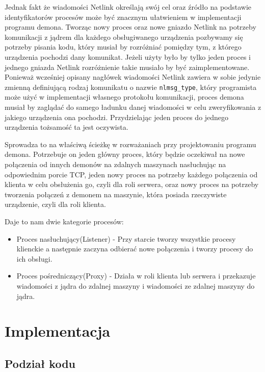 \documentclass[10pt]{scrartcl}
\begin{document}
Jednak fakt że wiadomości Netlink określają swój cel oraz źródło na podstawie identyfikatorów procesów może być znacznym ułatwieniem w implementacji programu demona. Tworząc nowy proces oraz nowe gniazdo Netlink na potrzeby komunikacji z jądrem dla każdego obsługiwanego urządzenia pozbywamy się potrzeby pisania kodu, który musiał by rozróżniać pomiędzy tym, z którego urządzenia pochodzi dany komunikat. Jeżeli użyty było by tylko jeden proces i jednego gniazda Netlink rozróżnienie takie musiało by być zaimplementowane. Ponieważ wcześniej opisany nagłówek wiadomości Netlink zawiera w sobie jedynie zmienną definiującą rodzaj komunikatu o nazwie \texttt{nlmsg\_type}, który programista może użyć w implementacji własnego protokołu komunikacji, proces demona musiał by zaglądać do samego ładunku danej wiadomości w celu zweryfikowania z jakiego urządzenia ona pochodzi. Przydzielając jeden proces do jednego urządzenia tożsamość ta jest oczywista.

Sprowadza to na właściwą ścieżkę w rozważaniach przy projektowaniu programu demona. Potrzebuje on jeden główny proces, który będzie oczekiwał na nowe połączenia od innych demonów na zdalnych maszynach nasłuchując na odpowiednim porcie TCP, jeden nowy proces na potrzeby każdego połączenia od klienta w celu obsłużenia go, czyli dla roli serwera, oraz nowy proces na potrzeby tworzenia połączeń z demonem na maszynie, która posiada rzeczywiste urządzenie, czyli dla roli klienta.

Daje to nam dwie kategorie procesów:

\begin{itemize}
\itemsep1pt\parskip0pt
\item
  Proces nasłuchujący(Listener) - Przy starcie tworzy wszystkie procesy klienckie a następnie zaczyna odbierać nowe połączenia i tworzy procesy do ich obsługi.
\item
  Proces pośredniczący(Proxy) - Działa w roli klienta lub serwera i przekazuje wiadomości z jądra do zdalnej maszyny i wiadomości ze zdalnej maszyny do jądra.
\end{itemize}

\section{Implementacja}

\subsection{Podział kodu}
\end{document}
